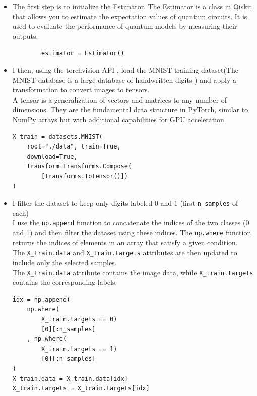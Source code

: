 \documentclass[conference]{IEEEtran}
\begin{document}
\begin{itemize}
    \item The first step is to initialize the Estimator. The Estimator is a class in Qiskit that allows you to estimate the expectation values of quantum circuits. It is used to evaluate the performance of quantum models by measuring their outputs.
        {\small
        \begin{verbatim}
        estimator = Estimator()
        \end{verbatim}
        }
    \item I then, using the torchvision API \cite{paszke2019pytorch}, load the MNIST training dataset(The MNIST database is a large database of handwritten digits \cite{lecun2010mnist}) and apply a transformation to convert images to tensors.\\
        A tensor is a generalization of vectors and matrices to any number of dimensions. They are the fundamental data structure in PyTorch, similar to NumPy arrays but with additional capabilities for GPU acceleration.
        
{\raggedright
\small
\begin{verbatim}
X_train = datasets.MNIST(
    root="./data", train=True,
    download=True, 
    transform=transforms.Compose(
        [transforms.ToTensor()])
)
\end{verbatim}
}



    \item I filter the dataset to keep only digits labeled 0 and 1 (first \texttt{n\_samples} of each)\\
        I use the \texttt{np.append} function to concatenate the indices of the two classes (0 and 1) and then filter the dataset using these indices. The \texttt{np.where} function returns the indices of elements in an array that satisfy a given condition.\\
        The \texttt{X\_train.data} and \texttt{X\_train.targets} attributes are then updated to include only the selected samples.\\
        The \texttt{X\_train.data} attribute contains the image data, while \texttt{X\_train.targets} contains the corresponding labels.
        
{\raggedright
\small
\begin{verbatim}
idx = np.append(
    np.where(
        X_train.targets == 0)
        [0][:n_samples]
    , np.where(
        X_train.targets == 1)
        [0][:n_samples]
)
X_train.data = X_train.data[idx]
X_train.targets = X_train.targets[idx]  
\end{verbatim}
}
        

\end{itemize}
\end{document}
